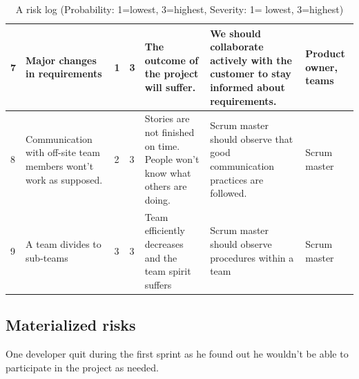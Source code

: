 \begin{table}[H]
{\begin{tabular}{|p{0.5cm}|p{3cm}|p{1cm}|p{1.5cm}|p{4cm}|p{4cm}|p{1cm}|}
7 &
Major changes in requirements &
1 &
3 &
The outcome of the project will suffer. &
We should collaborate actively with the customer to stay informed about requirements. &
Product owner, teams
\\
\hline

8 &
Communication with off-site team members wont't work as supposed. &
2 &
3 &
Stories are not finished on time. People won't know what others are doing. &
Scrum master should observe that good communication practices are followed. &
Scrum master
\\
\hline

9 &
A team divides to sub-teams &
3 &
3 &
Team efficiently decreases and the team spirit suffers &
Scrum master should observe procedures within a team &
Scrum master
\\
\hline

\end{tabular} 
}
\caption{A risk log (Probability: 1=lowest, 3=highest, Severity: 1= lowest, 
3=highest)}
\label{table:Risklog}
\end{table}

\subsection{Materialized risks}

One developer quit during the first sprint as he found out he wouldn't be able to participate in the project as needed.

